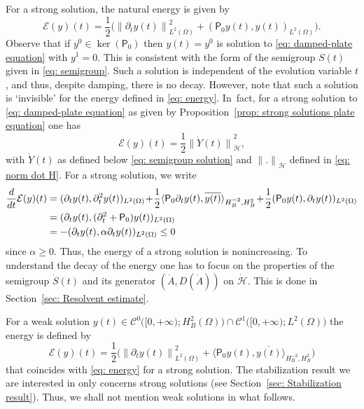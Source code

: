 \documentclass[10pt]{amsart}
\theoremstyle{plain}
\theoremstyle{definition}
\let \Re \relax
\DeclareMathOperator{\Re}{Re}
\newcommand{\ovl}[1]{\overline{#1}}
\newcommand{\inp}[2]{(#1, #2)}
\newcommand{\dup}[2]{\langle #1 , #2 \rangle}
\renewcommand{\H}{{\mathcal H}}
\newcommand{\E}{\ensuremath{\mathcal E}}
\newcommand{\Norm}[2]{{\| #1 \|}_{#2}}
\newcommand{\Con}{\ensuremath{\mathscr C}}
\newcommand{\Pell}{\mathsf P_0}
\begin{document}
For a strong solution, the natural energy is given by
\begin{equation}
\label{eq: energy}
\E(y) (t) = \frac12 \big(\Norm{\partial_t y (t)}{L^2(\Omega)}^2
+ \inp{\Pell y (t)}{y (t)}_{L^2(\Omega)}
\big).
\end{equation}
Observe that if $y^0 \in \ker(\Pell)$ then $y(t) = y^0$ is solution
to \eqref{eq: damped-plate equation} with $y^1=0$. This is
consistent with the form of the semigroup $S(t)$ given in \eqref{eq:
semigroup}. Such a solution is independent of the evolution
variable $t$, and thus, despite damping, there is no decay. However,
note that such a solution is `invisible' for the energy defined in
\eqref{eq: energy}. In~fact, for a strong solution to \eqref{eq:
damped-plate equation} as given by Proposition~\ref{prop: strong solutions plate equation} one has
\begin{equation}
\label{eq: connection energy norm H dot}
\E(y) (t) = \frac12 \Norm{\dot Y(t)}{\dot \H}^2,
\end{equation}
with $\dot Y(t)$ as defined below
\eqref{eq: semigroup solution} and $\Norm{.}{\dot \H}$ defined in
\eqref{eq: norm dot H}. For a strong solution, we write
\begin{align*}
\frac{d}{d t} \E(y) (t)
&= \Re \inp{\partial_t y(t) }{\partial_t^2 y(t)}_{L^2(\Omega)}
\!+\! \frac12 \dup{\Pell \partial_t y(t)}{\ovl{y(t)}}_{H^{-2}_B, H^2_B} \!+\! \frac12 \inp{\Pell y(t)}{\partial_t y(t)}_{L^2(\Omega)}\\
&= \Re \inp{\partial_t y(t) }{(\partial_t^2 + \Pell) y(t)}_{L^2(\Omega)}\\
&= - \Re \inp{\partial_t y(t) }{\alpha\partial_t y(t)}_{L^2(\Omega)} \leq 0
\end{align*}
since $\alpha \geq 0$. Thus, the energy of a strong solution is nonincreasing.
To understand the decay of the energy one has to focus on the
properties of the semigroup $\dot S(t)$ and its generator $(\dot A,
D(\dot A))$ on $\dot \H$. This is done in Section~\ref{sec: Resolvent estimate}.

For a weak solution $y(t) \in \Con^0 \big([0,+\infty); H^2_B(\Omega)\big)
\cap \Con^1 \big([0,+\infty); L^2(\Omega) \big)$ the energy is
defined by
\begin{equation*}
\E(y) (t) = \frac12 \big(\Norm{\partial_t y (t)}{L^2(\Omega)}^2
+ \dup{\Pell y (t)}{\ovl{y (t)}}_{H^{-2}_B, H^2_B}
\big)
\end{equation*}
that coincides with \eqref{eq: energy} for a strong solution.
The stabilization result we are interested in only concerns strong
solutions (see Section~\ref{sec: Stabilization result}). Thus, we shall
not mention weak solutions in what follows.
\end{document}
